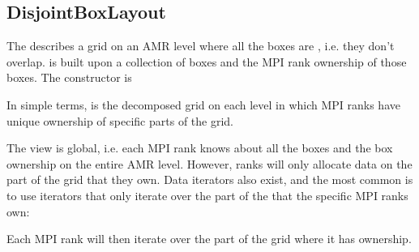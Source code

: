 \documentclass[letterpaper,10pt,english]{sphinxmanual}
\begin{document}
\subsection{DisjointBoxLayout}
\label{\detokenize{Basics:disjointboxlayout}}
The  describes a grid on an AMR level where all the boxes are , i.e. they don’t overlap.
 is built upon a collection of boxes and the MPI rank ownership of those boxes.
The constructor is

\begin{sphinxVerbatim}[commandchars=\\\{\},formatcom=\scriptsize]
   
   

  
\end{sphinxVerbatim}

In simple terms,   is the decomposed grid on each level in which MPI ranks have unique ownership of specific parts of the grid.

The  view is global, i.e. each MPI rank knows about all the boxes and the box ownership on the entire AMR level.
However, ranks will only allocate data on the part of the grid that they own.
Data iterators also exist, and the most common is to use iterators that only iterate over the part of the  that the specific MPI ranks own:

\begin{sphinxVerbatim}[commandchars=\\\{\},formatcom=\scriptsize]
      
\end{sphinxVerbatim}

Each MPI rank will then iterate  over the part of the grid where it has ownership.
\end{document}
